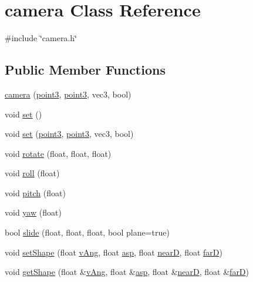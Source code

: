 \hypertarget{classcamera}{}\section{camera Class Reference}
\label{classcamera}


{\ttfamily \#include \char`\"{}camera.\+h\char`\"{}}

\subsection*{Public Member Functions}
\begin{DoxyCompactItemize}
\item 
\hyperlink{classcamera_a44a13e132dac8dde93536347ac2d18a6}{camera} (\hyperlink{classpoint3}{point3}, \hyperlink{classpoint3}{point3}, vec3, bool)
\item 
void \hyperlink{classcamera_a7ebf7f711ade618ac641b2ab29f619e1}{set} ()
\item 
void \hyperlink{classcamera_aa5561aba012714e140ff11ac2544ff56}{set} (\hyperlink{classpoint3}{point3}, \hyperlink{classpoint3}{point3}, vec3, bool)
\item 
void \hyperlink{classcamera_ab44bba4ebddf9079239507acad2802db}{rotate} (float, float, float)
\item 
void \hyperlink{classcamera_a3da4be99d5e2d1e3b1463a641e5ecc5a}{roll} (float)
\item 
void \hyperlink{classcamera_aff5c9f3f12062d6f65a7b8d94b9739da}{pitch} (float)
\item 
void \hyperlink{classcamera_acea846eceb98867afb1fc658ebe3bc50}{yaw} (float)
\item 
bool \hyperlink{classcamera_a903ee814bc121ea7bf030b1f67b4281e}{slide} (float, float, float, bool plane=true)
\item 
void \hyperlink{classcamera_a3b99e5ad64e63db86d3e826e43fc2228}{set\+Shape} (float \hyperlink{classcamera_ae8f2970ceb202edb61903e139271913d}{v\+Ang}, float \hyperlink{classcamera_aa7ca5df7a2626926b97db7d20f57de24}{asp}, float \hyperlink{classcamera_acc408f55afe5a320132da72d46498d7d}{nearD}, float \hyperlink{classcamera_a970214e0ae175df8fb37d25a8081cea3}{farD})
\item 
void \hyperlink{classcamera_a3139e23f1084f481d21dda80196f1e7f}{get\+Shape} (float \&\hyperlink{classcamera_ae8f2970ceb202edb61903e139271913d}{v\+Ang}, float \&\hyperlink{classcamera_aa7ca5df7a2626926b97db7d20f57de24}{asp}, float \&\hyperlink{classcamera_acc408f55afe5a320132da72d46498d7d}{nearD}, float \&\hyperlink{classcamera_a970214e0ae175df8fb37d25a8081cea3}{farD})

\end{DoxyCompactItemize}
